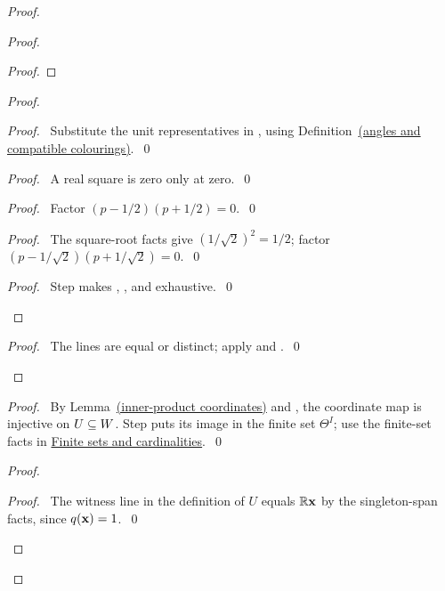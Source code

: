\begin{mergedproofsection}
\begin{proof}
\begin{proof}
\begin{proof}
 \end{proof}
 \begin{proof}
  \begin{proof}\pf\ Substitute the unit representatives in
  , using Definition~\hyperref[def:312-angles]{(angles and compatible colourings)}.~\qed\end{proof}
  \begin{proof}\pf\ A real square is zero only at zero.~\qed\end{proof}
  \begin{proof}\pf\ Factor $(p-1/2)(p+1/2)=0$.~\qed\end{proof}
  \begin{proof}\pf\ The square-root facts give $(1/\sqrt2)^2=1/2$;
  factor $(p-1/\sqrt2)(p+1/\sqrt2)=0$.~\qed\end{proof}
  \qedstep
  \begin{proof}\pf\ Step  makes
  , , and
   exhaustive.~\qed\end{proof}
 \end{proof}
 \qedstep
 \begin{proof}\pf\ The lines are equal or distinct; apply
  and .~\qed\end{proof}
\end{proof}
\begin{proof}\pf\ By Lemma~\hyperref[lem:312-coordinates]{(inner-product coordinates)} and
, the coordinate map is injective on $U\subseteq W$.
Step  puts its image in the finite set
$\Theta^I$; use the finite-set facts in \hyperref[facts:312-finite]{Finite sets and cardinalities}.~\qed\end{proof}
\begin{proof}
 \begin{proof}\pf\ The witness line in the definition of $U$ equals
 ${\mathbb R}{\mathbf x}$ by the singleton-span facts, since $q({\mathbf x})=1$.~\qed\end{proof}

\end{proof}
\end{proof}
\end{mergedproofsection}

